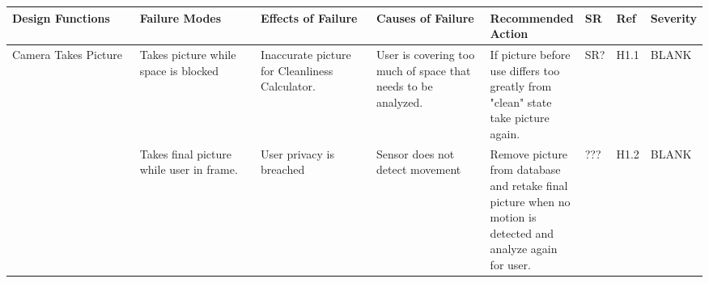 \documentclass{article}
\begin{document}
\begin{table}[H]
\begin{adjustbox}{width=\textwidth}
\begin{tabular}{|p{0.25\linewidth} | p{0.25\linewidth} | p{0.22\linewidth}|  p{0.22\linewidth}|  p{0.30\linewidth}|  p{0.085\linewidth}|  p{0.05\linewidth}|p{0.12\linewidth}| }
    \hline
         \textbf{Design Functions} & \textbf{Failure Modes} & \textbf{Effects of Failure} & \textbf{Causes of Failure} & \textbf{Recommended Action} & \textbf{SR} & \textbf{Ref} & \textbf{Severity}\\
         \hline
         Camera Takes Picture & Takes picture while space is blocked\newline & Inaccurate picture for Cleanliness Calculator.\newline & User is covering too much of space that needs to be analyzed.\newline & If picture before use differs too greatly from "clean" state take picture again. & SR? & H1.1 & BLANK\\
          & Takes final picture while user in frame. & User privacy is breached & Sensor does not detect movement& Remove picture from database and retake final picture when no motion is detected and analyze again for user.  & ??? & H1.2 & BLANK\\
         \hline

\end{tabular}
\end{adjustbox}
\end{table}
\end{document}
